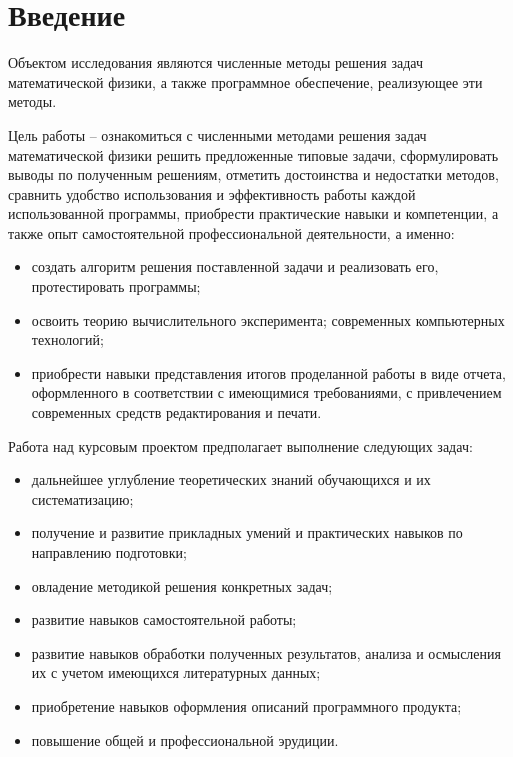 \documentclass[14pt, a4paper]{extarticle}
\begin{document}
	
	\pagebreak
	
	\pagebreak
	
	\section{Введение}
	
	Объектом исследования являются численные методы решения задач математической физики, а также программное обеспечение, реализующее эти методы.
	
	Цель работы – ознакомиться с численными методами решения задач математической физики решить предложенные типовые задачи, сформулировать выводы по полученным решениям, отметить достоинства и недостатки методов, сравнить удобство использования и эффективность работы каждой использованной программы, приобрести практические навыки и компетенции, а также опыт самостоятельной профессиональной деятельности, а именно:
	
	\begin{itemize}
		\item создать алгоритм решения поставленной задачи и реализовать его, протестировать программы;
		
		\item освоить теорию вычислительного эксперимента; современных компьютерных технологий;
		
		\item приобрести навыки представления итогов проделанной работы в виде отчета, оформленного в соответствии с имеющимися требованиями, с привлечением современных средств редактирования и печати.
		
	\end{itemize}

	Работа над курсовым проектом предполагает выполнение следующих задач:
	
	\begin{itemize}
		\item дальнейшее углубление теоретических знаний обучающихся и их систематизацию;
		
		\item получение и развитие прикладных умений и практических навыков по направлению подготовки;
		
		\item овладение методикой решения конкретных задач;
		
		\item развитие навыков самостоятельной работы;
		
		\item развитие навыков обработки полученных результатов, анализа и осмысления их с учетом имеющихся литературных данных;
		
		\item приобретение навыков оформления описаний программного продукта;
		
		\item повышение общей и профессиональной эрудиции.
		
	\end{itemize}
\end{document}
